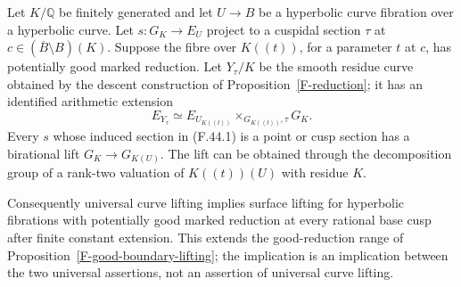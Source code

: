 \begin{proposition}
\label{F-potential-boundary-lifting}
Let $K/\mathbb Q$ be finitely generated and let $U\to B$ be a
hyperbolic curve fibration over a hyperbolic curve. Let
$s:G_K\to E_U$ project to a cuspidal section $\tau$ at
$c\in(\overline B\setminus B)(K)$. Suppose the fibre over
$K((t))$, for a parameter $t$ at $c$, has potentially good
marked reduction. Let $Y_\tau/K$ be the smooth residue
curve obtained by the descent construction of
Proposition~\ref{F-reduction}; it has an identified arithmetic
extension
\[
 E_{Y_\tau}\simeq
 E_{U_{K((t))}}\mathbin{\times}_{G_{K((t))},\tau}G_K.
 \tag{F.44.1}
\]
Every $s$ whose induced section in (F.44.1) is a point or
cusp section has a birational lift $G_K\to G_{K(U)}$.
The lift can be obtained through the decomposition group
of a rank-two valuation of $K((t))(U)$ with residue $K$.

Consequently universal curve lifting implies surface
lifting for hyperbolic fibrations with potentially good
marked reduction at every rational base cusp after finite
constant extension. This extends the good-reduction range
of Proposition~\ref{F-good-boundary-lifting}; the implication
is an implication between the two universal assertions,
not an assertion of universal curve lifting.
\end{proposition}
